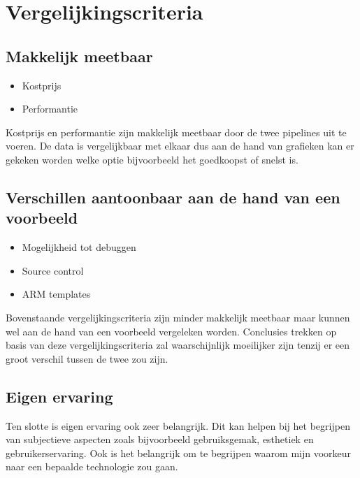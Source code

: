 \chapter{Vergelijkingscriteria}%
\label{ch:vergelijkingscriteria}

\section{Makkelijk meetbaar}

\begin{itemize}
    \item Kostprijs
    \item Performantie
\end{itemize}

Kostprijs en performantie zijn makkelijk meetbaar door de twee pipelines uit te voeren. De data is vergelijkbaar met elkaar dus aan de hand van grafieken kan er gekeken worden welke optie bijvoorbeeld het goedkoopst of snelst is. 

\section{Verschillen aantoonbaar aan de hand van een voorbeeld}

\begin{itemize}
    \item Mogelijkheid tot debuggen
    \item Source control
    \item ARM templates
\end{itemize}

Bovenstaande vergelijkingscriteria zijn minder makkelijk meetbaar maar kunnen wel aan de hand van een voorbeeld vergeleken worden. Conclusies trekken op basis van deze vergelijkingscriteria zal waarschijnlijk moeilijker zijn tenzij er een groot verschil tussen de twee zou zijn.

\section{Eigen ervaring}

Ten slotte is eigen ervaring ook zeer belangrijk. Dit kan helpen bij het begrijpen van subjectieve aspecten zoals bijvoorbeeld gebruiksgemak, esthetiek en gebruikerservaring. Ook is het belangrijk om te begrijpen waarom mijn voorkeur naar een bepaalde technologie zou gaan.